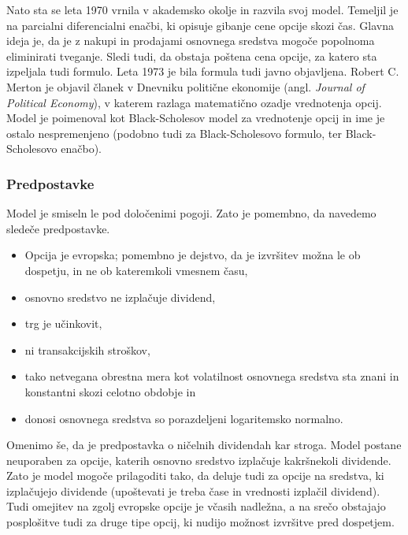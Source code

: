 \documentclass[12pt,a4paper]{amsart}
\theoremstyle{definition} %
\theoremstyle{plain} %
\begin{document}
Nato sta se leta 1970 vrnila v akademsko okolje
in razvila svoj model. Temeljil je na parcialni diferencialni enačbi, ki opisuje gibanje cene
opcije skozi čas. Glavna ideja je, da je z nakupi in prodajami osnovnega sredstva
mogoče popolnoma eliminirati tveganje. Sledi tudi, da obstaja poštena cena opcije, za 
katero sta izpeljala tudi formulo. Leta 1973 je bila formula tudi javno objavljena.
Robert C. Merton je objavil članek v Dnevniku politične ekonomije (angl. \textit{Journal 
of Political Economy}), v katerem razlaga matematično ozadje vrednotenja opcij. Model je
poimenoval kot Black-Scholesov model za vrednotenje opcij in ime je ostalo nespremenjeno
(podobno tudi za Black-Scholesovo formulo, ter Black-Scholesovo enačbo).

\subsubsection{Predpostavke}
Model je smiseln le pod določenimi pogoji. Zato je pomembno, da navedemo sledeče 
predpostavke.
\begin{itemize}
  \item Opcija je evropska; pomembno je dejstvo, da je izvršitev možna le ob dospetju,
	in ne ob kateremkoli vmesnem času,
  \item osnovno sredstvo ne izplačuje dividend,
  \item trg je učinkovit,
  \item ni transakcijskih stroškov,
  \item tako netvegana obrestna mera kot volatilnost osnovnega sredstva sta znani
	in konstantni skozi celotno obdobje in
  \item donosi osnovnega sredstva so porazdeljeni logaritemsko normalno.
\end{itemize}
Omenimo še, da je predpostavka o ničelnih dividendah kar stroga. Model postane
neuporaben za opcije, katerih osnovno sredstvo izplačuje kakršnekoli dividende. Zato
je model mogoče prilagoditi tako, da deluje tudi za opcije na sredstva, ki izplačujejo
dividende (upoštevati je treba čase in vrednosti izplačil dividend). Tudi omejitev na zgolj
evropske opcije je včasih nadležna, a na srečo obstajajo posplošitve tudi za druge 
tipe opcij, ki nudijo možnost izvršitve pred dospetjem.
\end{document}
